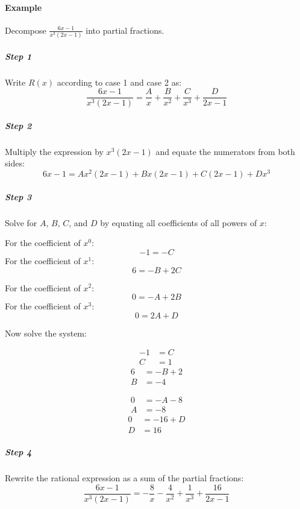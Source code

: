 				\paragraph{Example}
					Decompose $\frac{6x-1}{x^3(2x-1)}$ into partial fractions.
					\subparagraph{Step 1}
						Write $R(x)$ according to case 1 and case 2 as:
						\[\frac{6x-1}{x^3(2x-1)} = \frac{A}{x} + \frac{B}{x^2} + \frac{C}{x^3} + \frac{D}{2x-1}\]
					\subparagraph{Step 2}
						Multiply the expression by $x^3(2x-1)$ and equate the numerators from both sides:
						\[6x-1 = Ax^2(2x-1) + Bx(2x-1) + C(2x-1) + Dx^3\]
					\subparagraph{Step 3}
						Solve for $A$, $B$, $C$, and $D$ by equating all coefficients of all powers of $x$:
						
						\begin{minipage}[t]{0.5\textwidth}
							\centering
							For the coefficient of $x^0$:
							\[-1 = -C\]
							For the coefficient of $x^1$:
							\[6 = -B + 2C\]
						\end{minipage}
						\begin{minipage}[t]{0.5\textwidth}
							\centering
							For the coefficient of $x^2$:
							\[0 = -A + 2B\]
							For the coefficient of $x^3$:
							\[0 = 2A + D\]
						\end{minipage}

						Now solve the system:

						\begin{minipage}[t]{0.5\textwidth}
							\begin{align*}
								-1 &= C \\
								C &= 1
							\end{align*}
							\begin{align*}
								6 &= -B + 2 \tag{Substitute in $C=1$}\\
								B &= -4
							\end{align*}
						\end{minipage}
						\begin{minipage}[t]{0.5\textwidth}
							\begin{align*}
								0 &= -A - 8 \tag{Substitute in $B=-4$}\\
								A &= -8
							\end{align*}
							\begin{align*}
								0 &= -16 + D \tag{Substitute in $A=-8$}\\
								D &= 16
							\end{align*}
						\end{minipage}
					\subparagraph{Step 4}
						Rewrite the rational expression as a sum of the partial fractions:
						\[\frac{6x-1}{x^3(2x-1)} = -\frac{8}{x} - \frac{4}{x^2} + \frac{1}{x^3} + \frac{16}{2x-1}\]
			\newpage
